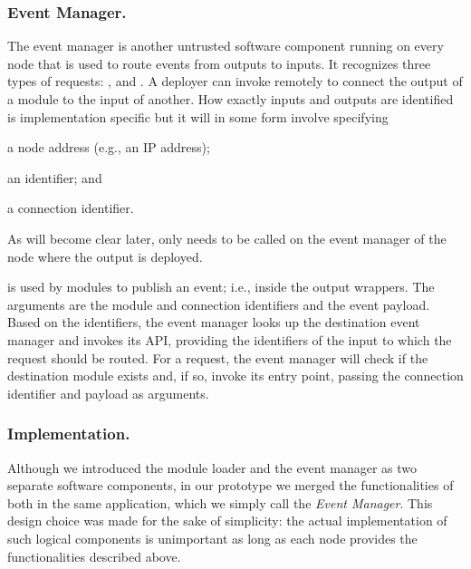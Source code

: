 \subsubsection{Event Manager.} \label{concept:event-manager}
%
The event manager is another untrusted software component running on every
node that is used to route events from outputs to inputs.  It recognizes
three types of requests: \addconnection, \handlelocalevent{} and
\handleremoteevent.  A deployer can invoke \addconnection{} remotely to
connect the output of a module to the input of another.  How exactly inputs
and outputs are identified is implementation specific but it will in some
form involve specifying
%
\begin{paraenum}
%
  \item a node address (e.g., an IP address);
%
  \item an \protmod{} identifier; and
%
  \item a connection identifier.
%
\end{paraenum}
%
As will become clear later, \addconnection{} only needs to be called on the
event manager of the node where the output \reactmod{} is deployed.

\handlelocalevent{} is used by modules to publish an event; i.e., inside the
output wrappers. The arguments are the module and connection identifiers and the
event payload. Based on the identifiers, the event manager looks up the
destination event manager and invokes its \handleremoteevent{} API, providing
the identifiers of the input to which the request should be routed.  For a
\handleremoteevent{} request, the event manager will check if the destination
module exists and, if so, invoke its \handleinput{} entry point, passing the
connection identifier and payload as arguments.

\subsubsection{Implementation.}
%
Although we introduced the module loader and the event manager as two separate
software components, in our prototype we merged the functionalities of both in
the same application, which we simply call the \emph{Event Manager}. This design
choice was made for the sake of simplicity: the actual implementation of such
logical components is unimportant as long as each node provides the
functionalities described above.

